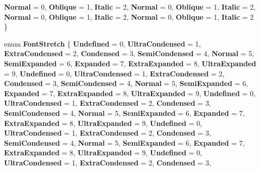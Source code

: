 \begin{DoxyCompactItemize}
{\bfseries Normal} = 0, 
\newline
{\bfseries Oblique} = 1, 
{\bfseries Italic} = 2, 
{\bfseries Normal} = 0, 
{\bfseries Oblique} = 1, 
\newline
{\bfseries Italic} = 2, 
{\bfseries Normal} = 0, 
{\bfseries Oblique} = 1, 
{\bfseries Italic} = 2, 
\newline
{\bfseries Normal} = 0, 
{\bfseries Oblique} = 1, 
{\bfseries Italic} = 2
 \}
\item 
\mbox{\label{namespace_windows_1_1_u_i_1_1_text_a5d8427c75e3dbef5872b8609b90b88e2}} 
enum {\bfseries Font\+Stretch} \{ \newline
{\bfseries Undefined} = 0, 
{\bfseries Ultra\+Condensed} = 1, 
{\bfseries Extra\+Condensed} = 2, 
{\bfseries Condensed} = 3, 
\newline
{\bfseries Semi\+Condensed} = 4, 
{\bfseries Normal} = 5, 
{\bfseries Semi\+Expanded} = 6, 
{\bfseries Expanded} = 7, 
\newline
{\bfseries Extra\+Expanded} = 8, 
{\bfseries Ultra\+Expanded} = 9, 
{\bfseries Undefined} = 0, 
{\bfseries Ultra\+Condensed} = 1, 
\newline
{\bfseries Extra\+Condensed} = 2, 
{\bfseries Condensed} = 3, 
{\bfseries Semi\+Condensed} = 4, 
{\bfseries Normal} = 5, 
\newline
{\bfseries Semi\+Expanded} = 6, 
{\bfseries Expanded} = 7, 
{\bfseries Extra\+Expanded} = 8, 
{\bfseries Ultra\+Expanded} = 9, 
\newline
{\bfseries Undefined} = 0, 
{\bfseries Ultra\+Condensed} = 1, 
{\bfseries Extra\+Condensed} = 2, 
{\bfseries Condensed} = 3, 
\newline
{\bfseries Semi\+Condensed} = 4, 
{\bfseries Normal} = 5, 
{\bfseries Semi\+Expanded} = 6, 
{\bfseries Expanded} = 7, 
\newline
{\bfseries Extra\+Expanded} = 8, 
{\bfseries Ultra\+Expanded} = 9, 
{\bfseries Undefined} = 0, 
{\bfseries Ultra\+Condensed} = 1, 
\newline
{\bfseries Extra\+Condensed} = 2, 
{\bfseries Condensed} = 3, 
{\bfseries Semi\+Condensed} = 4, 
{\bfseries Normal} = 5, 
\newline
{\bfseries Semi\+Expanded} = 6, 
{\bfseries Expanded} = 7, 
{\bfseries Extra\+Expanded} = 8, 
{\bfseries Ultra\+Expanded} = 9, 
\newline
{\bfseries Undefined} = 0, 
{\bfseries Ultra\+Condensed} = 1, 
{\bfseries Extra\+Condensed} = 2, 
{\bfseries Condensed} = 3, 

\end{DoxyCompactItemize}
